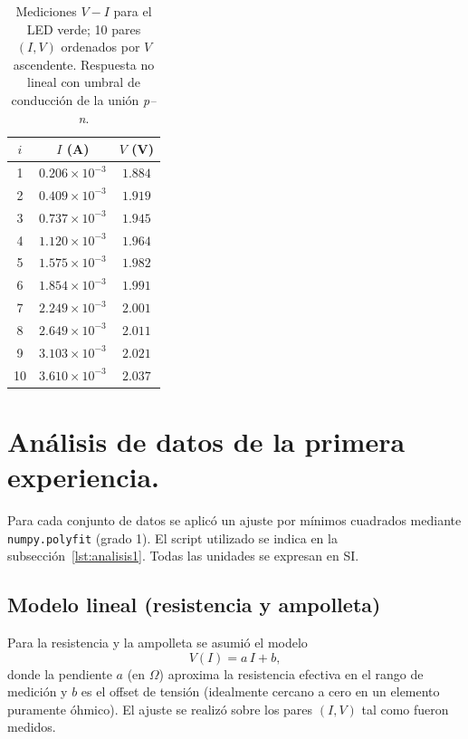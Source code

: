 \documentclass[11pt,twocolumn]{article}
\begin{document}
\begin{table}
\centering
\caption{Mediciones $V\!-\!I$ para el LED verde; 10 pares $(I,V)$ ordenados por $V$ ascendente. Respuesta no lineal con umbral de conducción de la unión \textit{p–n}.}
\label{tab1:led_verde}
\begin{tabular}{|c|c|c|}
\hline
$i$ & $I$ (A) & $V$ (V) \\
\hline
1  & $0.206\times 10^{-3}$ & $1.884$ \\
2  & $0.409\times 10^{-3}$ & $1.919$ \\
3  & $0.737\times 10^{-3}$ & $1.945$ \\
4  & $1.120\times 10^{-3}$ & $1.964$ \\
5  & $1.575\times 10^{-3}$ & $1.982$ \\
6  & $1.854\times 10^{-3}$ & $1.991$ \\
7  & $2.249\times 10^{-3}$ & $2.001$ \\
8  & $2.649\times 10^{-3}$ & $2.011$ \\
9  & $3.103\times 10^{-3}$ & $2.021$ \\
10 & $3.610\times 10^{-3}$ & $2.037$ \\
\hline
\end{tabular}
\end{table}

\section{Análisis de datos de la primera experiencia.}

Para cada conjunto de datos se aplicó un ajuste por mínimos cuadrados mediante \texttt{numpy.polyfit} (grado 1). El script utilizado se indica en la subsección~\ref{lst:analisis1}. Todas las unidades se expresan en SI.

\subsection{Modelo lineal (resistencia y ampolleta)}

Para la resistencia y la ampolleta se asumió el modelo
\begin{equation*}
    V(I) = a\,I + b,
\end{equation*}
donde la pendiente $a$ (en $\Omega$) aproxima la resistencia efectiva en el rango de medición y $b$ es el offset de tensión (idealmente cercano a cero en un elemento puramente óhmico). El ajuste se realizó sobre los pares $(I,V)$ tal como fueron medidos.
\end{document}
